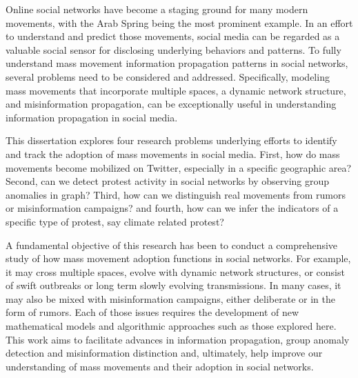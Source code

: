 \documentclass[12pt,dvips]{report}
\begin{document}
Online social networks have become a staging ground for many modern movements, with the Arab Spring being the most prominent example. In an effort to understand and predict those movements, social media can be regarded as a valuable social sensor for disclosing underlying behaviors and patterns. To fully understand mass movement information propagation patterns in social networks, several problems need to be considered and addressed. Specifically, modeling mass movements that incorporate multiple spaces, a dynamic network structure, and misinformation propagation, can be exceptionally useful in understanding information propagation in social media.

This dissertation explores four research problems underlying efforts to identify and track the adoption of mass movements in social media. First, how do mass movements become mobilized on Twitter, especially in a specific geographic area? Second, can we detect protest activity in social networks by observing group anomalies in graph? Third, how can we distinguish real movements from rumors or misinformation campaigns? and fourth, how can we infer the indicators of a specific type of protest, say climate related protest?

A fundamental objective of this research has been to conduct a comprehensive study of how mass movement adoption functions in social networks. For example, it may cross multiple spaces, evolve with dynamic network structures, or consist of swift outbreaks or long term slowly evolving transmissions. In many cases, it may also be mixed with misinformation campaigns, either deliberate or in the form of rumors. Each of those issues requires the development of new mathematical models and algorithmic approaches such as those explored here.  This work aims to facilitate advances in information propagation, group anomaly detection and misinformation distinction and, ultimately, help improve our understanding of mass movements and their adoption in social networks.


\end{document}

